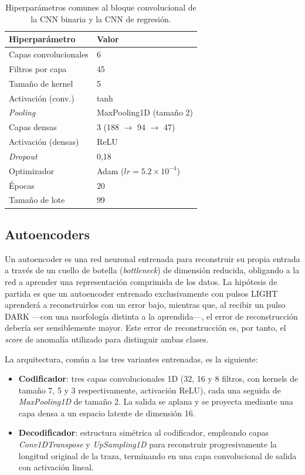 \begin{table}[h]
	\centering
	\caption{Hiperparámetros comunes al bloque convolucional de la CNN binaria y la CNN de regresión.}
	\label{tab:hiperparametros-cnn}
	\begin{tabular}{ll}
		\toprule
		Hiperparámetro & Valor \\
		\midrule
		Capas convolucionales & 6 \\
		Filtros por capa & 45 \\
		Tamaño de kernel & 5 \\
		Activación (conv.) & tanh \\
		\textit{Pooling} & MaxPooling1D (tamaño 2) \\
		Capas densas & 3 (188 $\rightarrow$ 94 $\rightarrow$ 47) \\
		Activación (densas) & ReLU \\
		\textit{Dropout} & 0,18 \\
		Optimizador & Adam ($lr=5.2\times10^{-4}$) \\
		Épocas & 20 \\
		Tamaño de lote & 99 \\
		\bottomrule
	\end{tabular}
\end{table}

\subsection{Autoencoders}
\label{sec:autoencoders}

Un autoencoder es una red neuronal entrenada para reconstruir su propia entrada a través de un cuello de botella (\textit{bottleneck}) de dimensión reducida, obligando a la red a aprender una representación comprimida de los datos. La hipótesis de partida es que un autoencoder entrenado exclusivamente con pulsos LIGHT aprenderá a reconstruirlos con un error bajo, mientras que, al recibir un pulso DARK —con una morfología distinta a la aprendida—, el error de reconstrucción debería ser sensiblemente mayor. Este error de reconstrucción es, por tanto, el \textit{score} de anomalía utilizado para distinguir ambas clases.

La arquitectura, común a las tres variantes entrenadas, es la siguiente:

\begin{itemize}
	\item \textbf{Codificador}: tres capas convolucionales 1D (32, 16 y 8 filtros, con kernels de tamaño 7, 5 y 3 respectivamente, activación ReLU), cada una seguida de \textit{MaxPooling1D} de tamaño 2. La salida se aplana y se proyecta mediante una capa densa a un espacio latente de dimensión 16.
	\item \textbf{Decodificador}: estructura simétrica al codificador, empleando capas \textit{Conv1DTranspose} y \textit{UpSampling1D} para reconstruir progresivamente la longitud original de la traza, terminando en una capa convolucional de salida con activación lineal.
\end{itemize}


